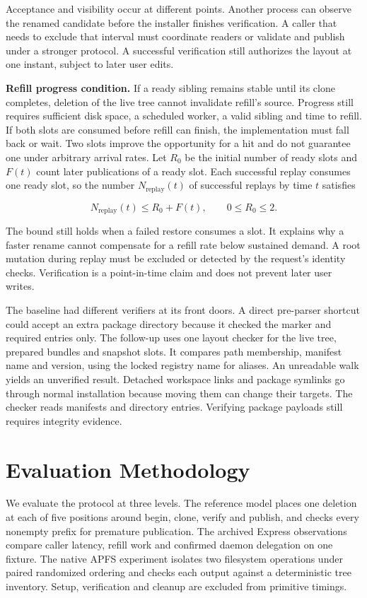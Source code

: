 \documentclass[
  11pt,
  letterpaper,
]{article}
\newcounter{none} %
\begin{document}
Acceptance and visibility occur at different points. Another process can
observe the renamed candidate before the installer finishes
verification. A caller that needs to exclude that interval must
coordinate readers or validate and publish under a stronger protocol. A
successful verification still authorizes the layout at one instant,
subject to later user edits.

\textbf{Refill progress condition.} If a ready sibling remains stable
until its clone completes, deletion of the live tree cannot invalidate
refill's source. Progress still requires sufficient disk space, a
scheduled worker, a valid sibling and time to refill. If both slots are
consumed before refill can finish, the implementation must fall back or
wait. Two slots improve the opportunity for a hit and do not guarantee
one under arbitrary arrival rates. Let \(R_0\) be the initial number of
ready slots and \(F(t)\) count later publications of a ready slot. Each
successful replay consumes one ready slot, so the number
\(N_{\mathrm{replay}}(t)\) of successful replays by time \(t\) satisfies

\[N_{\mathrm{replay}}(t)\le R_0+F(t),\qquad 0\le R_0\le 2.\]

The bound still holds when a failed restore consumes a slot. It explains
why a faster rename cannot compensate for a refill rate below sustained
demand. A root mutation during replay must be excluded or detected by
the request's identity checks. Verification is a point-in-time claim and
does not prevent later user writes.

The baseline had different verifiers at its front doors. A direct
pre-parser shortcut could accept an extra package directory because it
checked the marker and required entries only. The follow-up uses one
layout checker for the live tree, prepared bundles and snapshot slots.
It compares path membership, manifest name and version, using the locked
registry name for aliases. An unreadable walk yields an unverified
result. Detached workspace links and package symlinks go through normal
installation because moving them can change their targets. The checker
reads manifests and directory entries. Verifying package payloads still
requires integrity evidence.

\section{Evaluation Methodology}\label{evaluation-methodology}

We evaluate the protocol at three levels. The reference model places one
deletion at each of five positions around begin, clone, verify and
publish, and checks every nonempty prefix for premature publication. The
archived Express observations compare caller latency, refill work and
confirmed daemon delegation on one fixture. The native APFS experiment
isolates two filesystem operations under paired randomized ordering and
checks each output against a deterministic tree inventory. Setup,
verification and cleanup are excluded from primitive timings.
\end{document}
